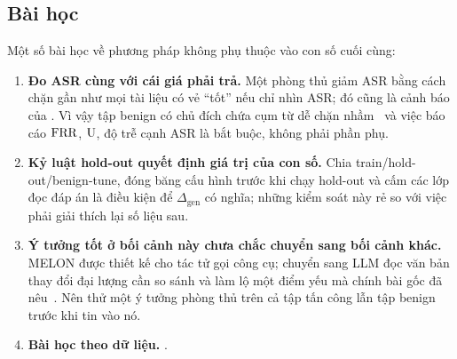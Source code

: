 \subsection{Bài học}
Một số bài học về phương pháp không phụ thuộc vào con số cuối cùng:
\begin{enumerate}[label=\arabic*.]
  \item \textbf{Đo ASR cùng với cái giá phải trả.} Một phòng thủ giảm ASR bằng cách chặn gần như mọi tài liệu có vẻ ``tốt'' nếu chỉ nhìn ASR; đó cũng là cảnh báo của \citet{wang2026landscape}. Vì vậy tập benign có chủ đích chứa cụm từ dễ chặn nhầm~\citep{li2024injecguard} và việc báo cáo $\mathrm{FRR}$, $\mathrm{U}$, độ trễ cạnh ASR là bắt buộc, không phải phần phụ.
  \item \textbf{Kỷ luật hold-out quyết định giá trị của con số.} Chia train/hold-out/benign-tune, đóng băng cấu hình trước khi chạy hold-out và cấm các lớp đọc đáp án là điều kiện để $\Delta_{\mathrm{gen}}$ có nghĩa; những kiểm soát này rẻ so với việc phải giải thích lại số liệu sau.
  \item \textbf{Ý tưởng tốt ở bối cảnh này chưa chắc chuyển sang bối cảnh khác.} MELON được thiết kế cho tác tử gọi công cụ; chuyển sang LLM đọc văn bản thay đổi đại lượng cần so sánh và làm lộ một điểm yếu mà chính bài gốc đã nêu~\citep{zhu2025melon}. Nên thử một ý tưởng phòng thủ trên cả tập tấn công lẫn tập benign trước khi tin vào nó.
  \item \textbf{Bài học theo dữ liệu.} .
\end{enumerate}

